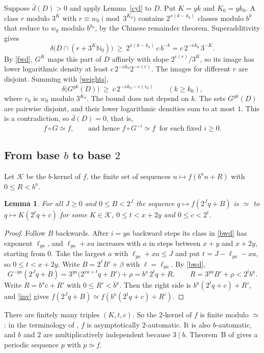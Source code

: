 \documentclass[11pt]{article}
\newtheorem{lemma}[theorem]{Lemma}
\theoremstyle{remark}
\newcommand{\N}{\mathbb{N}_0}
\newcommand{\ud}{\bar d}
\newcommand{\ld}{\delta}
\begin{document}
Suppose $\ud(D)>0$ and apply Lemma~\ref{cyl} to $D$. Put $K=yk$ and $K_0=yk_0$.
A class $r$ modulo $3^{K}$ with $r\equiv w_0\pmod{3^{K_0}}$ contains
$2^{x(k-k_0)}$ classes modulo $b^k$ that reduce to $w_0$ modulo $b^{k_0}$, by the
Chinese remainder theorem. Superadditivity gives
\[
\ld\bigl(D\cap(r+3^{K}\N)\bigr)\ \ge\ 2^{x(k-k_0)}\,c\,b^{-k}=c\,2^{-xk_0}\,3^{-K}.
\]
By \eqref{fwd}, $G^{K}$ maps this part of $D$ affinely with slope
$2^{e(r)}/3^{K}$, so its image has lower logarithmic density at least
$c\,2^{-xk_0}2^{-e(r)}$. The images for different $r$ are disjoint. Summing with
\eqref{weights},
\[
\ld\bigl(G^{yk}(D)\bigr)\ \ge\ c\,2^{-xk_0-e(r_0)}\qquad(k\ge k_0),
\]
where $r_0$ is $w_0$ modulo $3^{K_0}$. The bound does not depend on $k$. The
sets $G^{yk}(D)$ are pairwise disjoint, and their lower logarithmic densities
sum to at most $1$. This is a contradiction, so $\ud(D)=0$, that is,
\begin{equation}\label{inv}
f\circ G\simeq f,\qquad\text{and hence } f\circ G^{-i}\simeq f\ \text{ for each fixed } i\ge0 .
\end{equation}

\subsection{From base $b$ to base $2$}

Let $\mathcal K$ be the $b$-kernel of $f$, the finite set of sequences
$n\mapsto f(b^an+R)$ with $0\le R<b^a$.

\begin{lemma}\label{bridge}
For all $J\ge0$ and $0\le B<2^J$ the sequence $q\mapsto f(2^Jq+B)$ is $\simeq$ to
$q\mapsto K(2^tq+c)$ for some $K\in\mathcal K$, $0\le t<x+2y$ and $0\le c<2^t$.
\end{lemma}
\begin{proof}
Follow $B$ backwards. After $i=ya$ backward steps its class in \eqref{bwd} has
exponent $\ell_{ya}$, and $\ell_{ya}+xa$ increases with $a$ in steps between
$x+y$ and $x+2y$, starting from $0$. Take the largest $a$ with
$\ell_{ya}+xa\le J$ and put $t=J-\ell_{ya}-xa$, so $0\le t<x+2y$. Write
$B=2^{\ell}B'+\beta$ with $\ell=\ell_{ya}$. By \eqref{bwd},
\[
G^{-ya}(2^Jq+B)=3^{ya}\bigl(2^{xa+t}q+B'\bigr)+\rho=b^a\,2^tq+R,\qquad
R=3^{ya}B'+\rho<2^tb^a .
\]
Write $R=b^ac+R'$ with $0\le R'<b^a$. Then the right side is $b^a(2^tq+c)+R'$,
and \eqref{inv} gives $f(2^Jq+B)\simeq f(b^a(2^tq+c)+R')$.
\end{proof}

There are finitely many triples $(K,t,c)$. So the $2$-kernel of $f$ is finite
modulo $\simeq$: in the terminology of \cite{K}, $f$ is asymptotically
$2$-automatic. It is also $b$-automatic, and $b$ and $2$ are multiplicatively
independent because $3\mid b$. Theorem~B of \cite{K} gives a periodic sequence
$p$ with $p\simeq f$.
\end{document}
